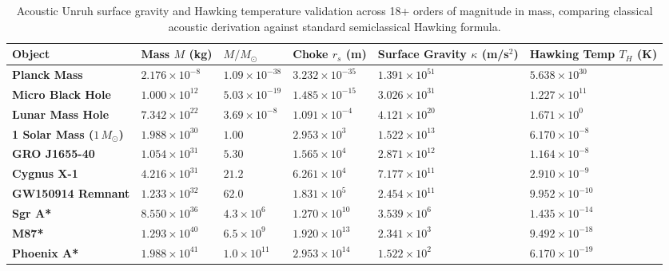\documentclass[11pt,a4paper]{article}
\begin{document}
\begin{table}[!htbp]
\centering
\caption{Acoustic Unruh surface gravity and Hawking temperature validation across 18+ orders of magnitude in mass, comparing classical acoustic derivation against standard semiclassical Hawking formula.}
\label{tab:hawking_18orders}
\footnotesize
\setlength{\tabcolsep}{4pt}
\renewcommand{\arraystretch}{1.18}
\begin{tabularx}{\textwidth}{L{2.9cm} C{2.2cm} C{2.0cm} C{2.2cm} Z Z}
\toprule
\textbf{Object} & \textbf{Mass $M$ (kg)} & \textbf{$M/M_\odot$} & \textbf{Choke $r_s$ (m)} & \textbf{Surface Gravity $\kappa$ (m/s$^2$)} & \textbf{Hawking Temp $T_H$ (K)} \\
\midrule
\textbf{Planck Mass} & $2.176 \times 10^{-8}$ & $1.09 \times 10^{-38}$ & $3.232 \times 10^{-35}$ & $1.391 \times 10^{51}$ & $5.638 \times 10^{30}$ \\
\textbf{Micro Black Hole} & $1.000 \times 10^{12}$ & $5.03 \times 10^{-19}$ & $1.485 \times 10^{-15}$ & $3.026 \times 10^{31}$ & $1.227 \times 10^{11}$ \\
\textbf{Lunar Mass Hole} & $7.342 \times 10^{22}$ & $3.69 \times 10^{-8}$ & $1.091 \times 10^{-4}$ & $4.121 \times 10^{20}$ & $1.671 \times 10^{0}$ \\
\textbf{1 Solar Mass ($1\,M_\odot$)} & $1.988 \times 10^{30}$ & $1.00$ & $2.953 \times 10^{3}$ & $1.522 \times 10^{13}$ & $6.170 \times 10^{-8}$ \\
\textbf{GRO J1655-40} & $1.054 \times 10^{31}$ & $5.30$ & $1.565 \times 10^{4}$ & $2.871 \times 10^{12}$ & $1.164 \times 10^{-8}$ \\
\textbf{Cygnus X-1} & $4.216 \times 10^{31}$ & $21.2$ & $6.261 \times 10^{4}$ & $7.177 \times 10^{11}$ & $2.910 \times 10^{-9}$ \\
\textbf{GW150914 Remnant} & $1.233 \times 10^{32}$ & $62.0$ & $1.831 \times 10^{5}$ & $2.454 \times 10^{11}$ & $9.952 \times 10^{-10}$ \\
\textbf{Sgr A*} & $8.550 \times 10^{36}$ & $4.3 \times 10^6$ & $1.270 \times 10^{10}$ & $3.539 \times 10^{6}$ & $1.435 \times 10^{-14}$ \\
\textbf{M87*} & $1.293 \times 10^{40}$ & $6.5 \times 10^9$ & $1.920 \times 10^{13}$ & $2.341 \times 10^{3}$ & $9.492 \times 10^{-18}$ \\
\textbf{Phoenix A*} & $1.988 \times 10^{41}$ & $1.0 \times 10^{11}$ & $2.953 \times 10^{14}$ & $1.522 \times 10^{2}$ & $6.170 \times 10^{-19}$ \\
\bottomrule
\end{tabularx}
\end{table}
\end{document}
